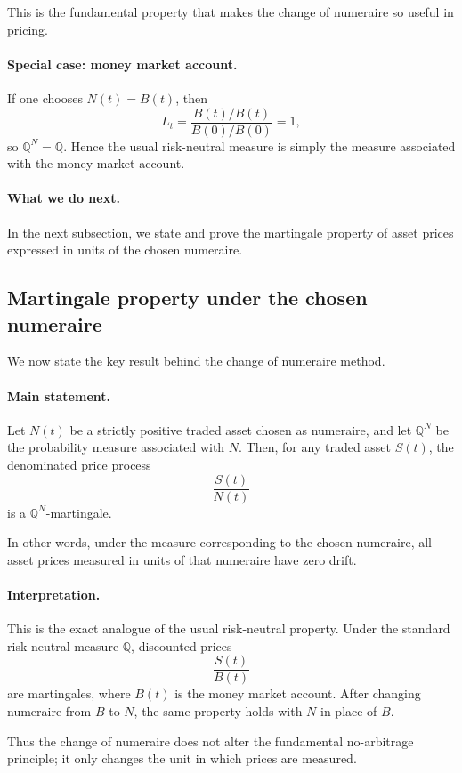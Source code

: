 \documentclass[11pt]{article}
\newcommand{\Qbb}{\mathbb{Q}}
\theoremstyle{definition}
\theoremstyle{plain}
\begin{document}
This is the fundamental property that makes the change of numeraire so
useful in pricing.

\paragraph{Special case: money market account.}
If one chooses \(N(t)=B(t)\), then
\[
L_t = \frac{B(t)/B(t)}{B(0)/B(0)} = 1,
\]
so \(\Qbb^N=\Qbb\).
Hence the usual risk-neutral measure is simply the measure associated
with the money market account.

\paragraph{What we do next.}
In the next subsection, we state and prove the martingale property of
asset prices expressed in units of the chosen numeraire.


\subsection{Martingale property under the chosen numeraire}

We now state the key result behind the change of numeraire method.

\paragraph{Main statement.}
Let \(N(t)\) be a strictly positive traded asset chosen as numeraire, and
let \(\Qbb^N\) be the probability measure associated with \(N\).
Then, for any traded asset \(S(t)\), the denominated price process
\[
\frac{S(t)}{N(t)}
\]
is a \(\Qbb^N\)-martingale.

In other words, under the measure corresponding to the chosen
numeraire, all asset prices measured in units of that numeraire have
zero drift.

\paragraph{Interpretation.}
This is the exact analogue of the usual risk-neutral property.
Under the standard risk-neutral measure \(\Qbb\), discounted prices
\[
\frac{S(t)}{B(t)}
\]
are martingales, where \(B(t)\) is the money market account.
After changing numeraire from \(B\) to \(N\), the same property holds
with \(N\) in place of \(B\).

Thus the change of numeraire does not alter the fundamental no-arbitrage
principle; it only changes the unit in which prices are measured.
\end{document}

